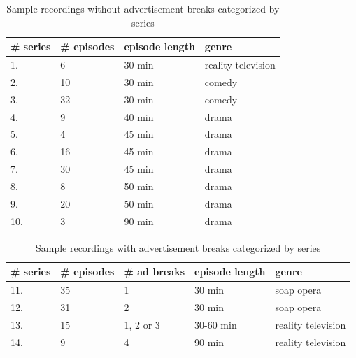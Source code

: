 \begin{table}[h]
    \begin{center}
    \begin{tabular}{|p{15mm}|p{20mm}|p{28mm}|p{30mm}|} %
        \hline
        \textbf{\# series} & \textbf{\# episodes} & \textbf{episode length} & \textbf{genre}  \\ \hline
        1. &  6 & 30 min & reality television\\ \hline
        2. & 10 & 30 min & comedy\\ \hline
        3. & 32 & 30 min & comedy\\ \hline
        4. &  9 & 40 min & drama\\ \hline
        5. &  4 & 45 min & drama\\ \hline
        6. &  16 & 45 min & drama\\ \hline
        7. & 30 & 45 min & drama\\ \hline
        8. &  8 & 50 min & drama\\ \hline
        9. & 20 & 50 min & drama\\ \hline
        10. & 3 & 90 min & drama\\ \hline
    \end{tabular}
    \end{center}
    \caption{Sample recordings without advertisement breaks categorized by series}
    \label{tab:data_no_ads}
\end{table}

\begin{table}[h]
    \begin{center}
    \begin{tabular}{|p{15mm}|p{20mm}|p{22mm}|p{28mm}|p{30mm}|} %
        \hline
        \textbf{\# series} & \textbf{\# episodes} & \textbf{\# ad breaks} & \textbf{episode length} & \textbf{genre}  \\ \hline
        11. & 35 & 1 & 30 min & soap opera\\ \hline
        12. & 31 & 2 & 30 min & soap opera\\ \hline
        13. & 15 & 1, 2 or 3 & 30-60 min & reality television\\ \hline
        14. &  9 & 4 & 90 min & reality television\\ \hline
    \end{tabular}
    \end{center}
    \caption{Sample recordings with advertisement breaks categorized by series}
    \label{tab:data_ads}
\end{table}

